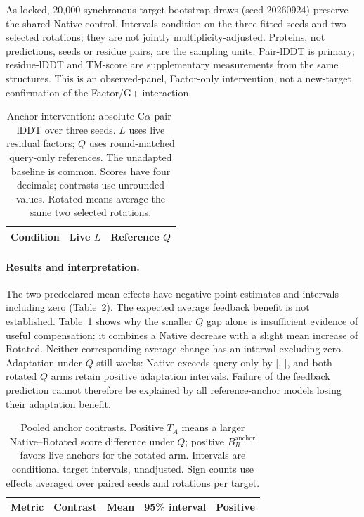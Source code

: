 As locked, 20,000 synchronous target-bootstrap draws (seed 20260924) preserve
the shared Native control. Intervals condition on the three fitted seeds
and two selected rotations; they are not jointly multiplicity-adjusted.
Proteins, not predictions, seeds or residue pairs, are the sampling units.
Pair-lDDT is primary; residue-lDDT and TM-score are supplementary measurements
from the same structures. This is an observed-panel, Factor-only intervention,
not a new-target confirmation of the Factor/G+ interaction.

\begin{table}[!htbp]\centering\small
\caption{Anchor intervention: absolute C$\alpha$ pair-lDDT over three seeds.
$L$ uses live residual factors; $Q$ uses round-matched query-only references.
The unadapted baseline is common. Scores have four decimals; contrasts use
unrounded values. Rotated means average the same two selected rotations.}
\label{tab:anchor_absolute}
\begin{tabular}{lrr}\toprule
Condition & Live $L$ & Reference $Q$ \\\midrule

\end{tabular}\end{table}

\paragraph{Results and interpretation.}
The two predeclared mean effects have negative point estimates and intervals
including zero (Table~\ref{tab:anchor_pooled}). The expected average feedback
benefit is not established. Table~\ref{tab:anchor_absolute} shows why the
smaller $Q$ gap alone is insufficient evidence of useful compensation:
it combines a Native decrease with a slight mean increase of Rotated.
Neither corresponding average change has an interval excluding zero.
Adaptation under $Q$ still works: Native exceeds query-only by
[,
], and both rotated $Q$ arms
retain positive adaptation intervals. Failure of the feedback prediction
cannot therefore be explained by all reference-anchor models losing their
adaptation benefit.

\begin{table}[!htbp]\centering\small
\caption{Pooled anchor contrasts. Positive $T_A$ means a larger Native--Rotated
score difference under $Q$; positive $B_R^{\mathrm{anchor}}$ favors live anchors for the
rotated arm. Intervals are conditional target intervals, unadjusted.
Sign counts use effects averaged over paired seeds and rotations per target.}
\label{tab:anchor_pooled}
\begin{tabular}{llrrr}\toprule
Metric & Contrast & Mean & 95\% interval & Positive \\\midrule

\end{tabular}\end{table}

